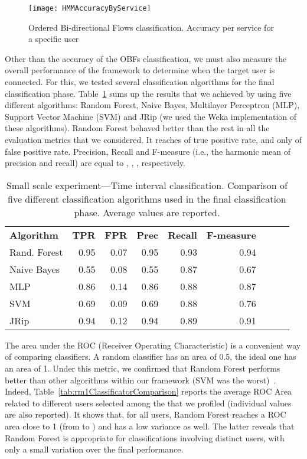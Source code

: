 \documentclass[10pt,conference,compsocconf,letterpaper]{IEEEtran}
\begin{document}
\begin{figure*}	
    \centering    
    \texttt{[image: HMMAccuracyByService]}
    \caption{Ordered Bi-directional Flows classification. Accuracy per service for a specific user}
\label{fig:HMMAccuracyByService}
\end{figure*}


Other than the accuracy of the OBFs classification, we must also measure the overall performance of the framework
to determine when the target user is connected. For this, we tested several  classification algorithms for the final 
classification phase. 
Table~\ref{tab:rm1Performance} sums up the results that we achieved by using five different algorithms: Random Forest, Naive Bayes, Multilayer Perceptron (MLP), Support Vector Machine (SVM) and JRip (we used the Weka implementation of these algorithms). Random Forest behaved better than the rest in all the evaluation metrics that we considered. It reaches  of true positive rate, and only  of false positive rate. Precision, Recall and F-measure (i.e., the harmonic mean of precision and recall) are equal to , , , respectively. 

\begin{table}[t]
\caption{Small scale experiment---Time interval classification. Comparison of five different classification algorithms used in the final classification phase.  Average values are reported. }
 \label{tab:rm1Performance}
 \begin{center}
\begin{tabular}{lrrrrrrrr}
\textbf{Algorithm} &\textbf{TPR} & \textbf{FPR} & \textbf{Prec} & \textbf{Recall} & \textbf{F-measure} \\
Rand. Forest &0.95&	0.07&	0.95&	0.93&	0.94\\
Naive Bayes &	0.55 &	0.08&	0.55&	0.87&	0.67\\
MLP &	0.86&	0.14&	0.86&	0.88&	0.87\\
SVM&	0.69&	0.09&	0.69&	0.88&	0.76\\
JRip&	0.94&	0.12&	0.94&	0.89&	0.91
\end{tabular}
\end{center}
\end{table}

The area under the ROC (Receiver Operating Characteristic) is a convenient way of comparing classifiers. A random classifier has an area of 0.5, the ideal one has an area of 1. Under this metric, we confirmed that Random Forest performs better than other algorithms within our framework (SVM was the worst)~\cite{fawcett04roc}. 
Indeed,  Table~\ref{tab:rm1ClassificatorComparison} reports the average ROC Area related to  different users selected among the  that we profiled (individual values are also reported). It shows that, for all users, Random Forest reaches a ROC area close to 1 (from  to ) and has a low variance as well. 
The latter reveals that Random Forest is appropriate for classifications involving distinct users, with only a small variation over the final performance. 
\end{document}
